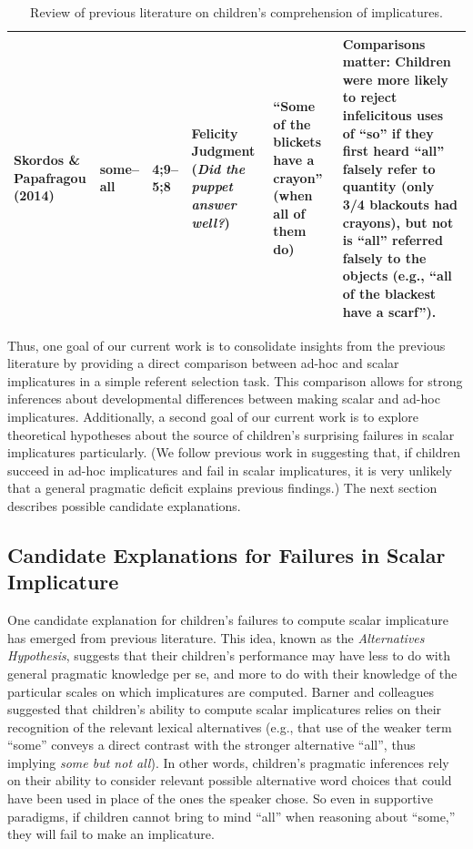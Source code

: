 \documentclass[man]{apa2}
\begin{document}
\begin{landscape}
\begin{table}[!ht]
\begin{tabular}{| p{2.2cm} | p{2cm} | p{1.69cm} | p{4.5cm} | p{5cm} | p{7.2cm} |}
\parbox[t]{2.2cm}{Skordos \&\\Papafragou (2014)} & some--all & 4;9--5;8 & Felicity Judgment (\textit{Did the puppet answer well?}) & ``Some of the blickets have a crayon'' (when all of them do)  & Comparisons matter: Children were more likely to reject infelicitous uses of ``so'' if they first heard ``all'' falsely refer to quantity (only 3/4 blackouts had crayons), but not is ``all'' referred falsely to the objects (e.g., ``all of the blackest have a scarf'').\\ \hline \end{tabular}
\caption{\label{tab:lit_review}Review of previous literature on children's comprehension of implicatures.}
\end{table}
\end{landscape}
\restoregeometry

Thus, one goal of our current work is to consolidate insights from the previous literature by providing a direct comparison between ad-hoc and scalar implicatures in a simple referent selection task. This comparison allows for strong inferences about developmental differences between making scalar and ad-hoc implicatures. Additionally, a second goal of our current work is to explore theoretical hypotheses about the source of children's surprising failures in scalar implicatures particularly. (We follow previous work in suggesting that, if children succeed in ad-hoc implicatures and fail in scalar implicatures, it is very unlikely that a general pragmatic deficit explains previous findings.) The next section describes possible candidate explanations.

\subsection{Candidate Explanations for Failures in Scalar Implicature}

One candidate explanation for children's failures to compute scalar implicature has emerged from previous literature. This idea, known as the \emph{Alternatives Hypothesis}, suggests that their children's performance may have less to do with general pragmatic knowledge per se, and more to do with their knowledge of the particular scales on which implicatures are computed. Barner and colleagues \cite{barner2010, barner2011} suggested that children's ability to compute scalar implicatures relies on their recognition of the relevant lexical alternatives (e.g., that use of the weaker term ``some'' conveys a direct contrast with the stronger alternative ``all'', thus implying \emph{some but not all}).  In other words, children's pragmatic inferences rely on their ability to consider relevant possible alternative word choices that could have been used in place of the ones the speaker chose. So even in supportive paradigms, if children cannot bring to mind ``all'' when reasoning about ``some,'' they will fail to make an implicature.
\end{document}
